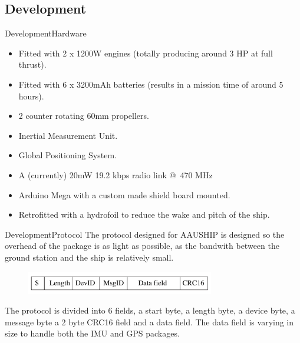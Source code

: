 \documentclass[10pt]{beamer}
\begin{document}
\subsection{Development}
\begin{frame}{Development}{Hardware}
\begin{itemize}
	\item Fitted with 2 x 1200W engines (totally producing around 3 HP at full thrust).
	\item Fitted with 6 x 3200mAh batteries (results in a mission time of around 5 hours).
	\item 2 counter rotating 60mm propellers.
	\item Inertial Measurement Unit.
	\item Global Positioning System.
	\item A (currently) 20mW 19.2 kbps radio link @ 470 MHz
	\item Arduino Mega with a custom made shield board mounted.
    \item Retrofitted with a hydrofoil to reduce the wake and pitch of the ship.
\end{itemize}
\end{frame}
\begin{frame}{Development}{Protocol}
The protocol designed for AAUSHIP is designed so the overhead of the package is as light as possible, as the bandwith between the ground station and the ship is relatively small. 
\begin{figure}
	\begin{center}
		\includegraphics[width=8.2cm]{img/protocol}
		\label{fig:protocol}
	\end{center}
\end{figure}
The protocol is divided into 6 fields, a start byte, a length byte, a device byte, a message byte a 2 byte CRC16 field and a data field. The data field is varying in size to handle both the IMU and GPS packages.
\end{frame}
\end{document}
